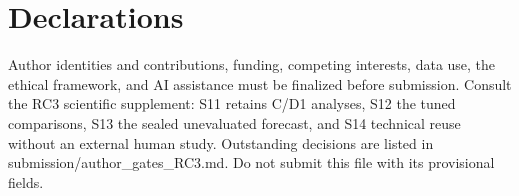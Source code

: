 \documentclass{IOS-Book-Article}
\begin{document}
\begin{frontmatter}
\title{\PaperTitle}
\author{\PaperAuthors}
\address{\PaperAffiliation}
\begin{abstract}

\end{abstract}
\begin{keyword}
\PaperKeywords
\end{keyword}
\end{frontmatter}

\section*{Declarations}
Author identities and contributions, funding, competing interests, data use, the ethical framework, and AI assistance must be finalized before submission. Consult the RC3 scientific supplement: S11 retains C/D1 analyses, S12 the tuned comparisons, S13 the sealed unevaluated forecast, and S14 technical reuse without an external human study. Outstanding decisions are listed in submission/author_gates_RC3.md. Do not submit this file with its provisional fields.


\end{document}
